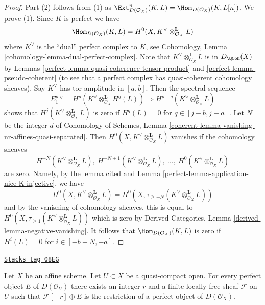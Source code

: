 \begin{proof}

Part (2) follows from (1) as $\Ext^n_{D(\mathcal{O}_X)}(K, L) =
\Hom_{D(\mathcal{O}_X)}(K, L[n])$. We prove (1).
Since $K$ is perfect we have
$$
\Hom_{D(\mathcal{O}_X)}(K, L) =
H^0(X, K^\vee \otimes_{\mathcal{O}_X}^\mathbf{L} L)
$$
where $K^\vee$ is the ``dual'' perfect complex to $K$, see
Cohomology, Lemma \ref{cohomology-lemma-dual-perfect-complex}.
Note that $K^\vee \otimes_{\mathcal{O}_X}^\mathbf{L} L$
is in $D_\QCoh(X)$ by
Lemmas \ref{perfect-lemma-quasi-coherence-tensor-product} and
\ref{perfect-lemma-pseudo-coherent} (to see that a perfect complex
has quasi-coherent cohomology sheaves). Say $K^\vee$ has
tor amplitude in $[a, b]$. Then the spectral sequence
$$
E_1^{p, q} = H^p(K^\vee \otimes_{\mathcal{O}_X}^\mathbf{L} H^q(L))
\Rightarrow
H^{p + q}(K^\vee \otimes_{\mathcal{O}_X}^\mathbf{L} L)
$$
shows that $H^j(K^\vee \otimes_{\mathcal{O}_X}^\mathbf{L} L)$
is zero if $H^q(L) = 0$ for $q \in [j - b, j - a]$.
Let $N$ be the integer $d$ of Cohomology of Schemes,
Lemma \ref{coherent-lemma-vanishing-nr-affines-quasi-separated}.
Then $H^0(X, K^\vee \otimes_{\mathcal{O}_X}^\mathbf{L} L)$
vanishes if the cohomology sheaves
$$
H^{-N}(K^\vee \otimes_{\mathcal{O}_X}^\mathbf{L} L),
\ H^{-N + 1}(K^\vee \otimes_{\mathcal{O}_X}^\mathbf{L} L),
\ \ldots,
\ H^0(K^\vee \otimes_{\mathcal{O}_X}^\mathbf{L} L)
$$
are zero. Namely, by the lemma cited and
Lemma \ref{perfect-lemma-application-nice-K-injective}, we have
$$
H^0(X, K^\vee \otimes_{\mathcal{O}_X}^\mathbf{L} L) =
H^0(X, \tau_{\geq -N}(K^\vee \otimes_{\mathcal{O}_X}^\mathbf{L} L))
$$
and by the vanishing of cohomology sheaves, this is equal to
$H^0(X, \tau_{\geq 1}(K^\vee \otimes_{\mathcal{O}_X}^\mathbf{L} L))$
which is zero by Derived Categories, Lemma
\ref{derived-lemma-negative-vanishing}.
It follows that $\Hom_{D(\mathcal{O}_X)}(K, L)$ is zero if
$H^i(L) = 0$ for $i \in [-b - N, -a]$.
\end{proof}

\begin{lemma}
\label{perfect-lemma-lift-perfect-complex-plus-locally-free}
\href{https://stacks.math.columbia.edu/tag/08EG}{\texttt{Stacks tag 08EG}}

Let $X$ be an affine scheme. Let $U \subset X$ be a quasi-compact open.
For every perfect object $E$ of $D(\mathcal{O}_U)$ there exists an integer
$r$ and a finite locally free sheaf $\mathcal{F}$ on $U$ such that
$\mathcal{F}[-r] \oplus E$ is the restriction of a perfect object of
$D(\mathcal{O}_X)$.
\end{lemma}

